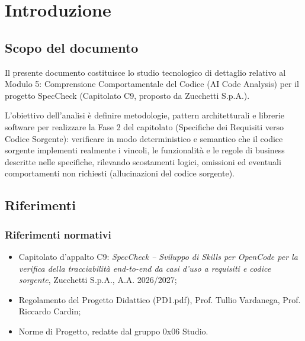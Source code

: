 \documentclass[a4paper, 11pt]{article}
\begin{document}
\newpage
\tableofcontents
\newpage

\section{Introduzione}

\subsection{Scopo del documento}
Il presente documento costituisce lo studio tecnologico di dettaglio relativo al Modulo 5: Comprensione Comportamentale del Codice (AI Code Analysis) per il progetto SpecCheck (Capitolato C9, proposto da Zucchetti S.p.A.).

L'obiettivo dell'analisi è definire metodologie, pattern architetturali e librerie software per realizzare la Fase 2 del capitolato (Specifiche dei Requisiti verso Codice Sorgente): verificare in modo deterministico e semantico che il codice sorgente implementi realmente i vincoli, le funzionalità e le regole di business descritte nelle specifiche, rilevando scostamenti logici, omissioni ed eventuali comportamenti non richiesti (allucinazioni del codice sorgente).

\subsection{Riferimenti}
\subsubsection{Riferimenti normativi}
\begin{itemize}[noitemsep]
    \item Capitolato d'appalto C9: \textit{SpecCheck -- Sviluppo di Skills per OpenCode per la verifica della tracciabilità end-to-end da casi d'uso a requisiti e codice sorgente}, Zucchetti S.p.A., A.A. 2026/2027;
    \item Regolamento del Progetto Didattico (PD1.pdf), Prof. Tullio Vardanega, Prof. Riccardo Cardin;
    \item Norme di Progetto, redatte dal gruppo 0x06 Studio.
\end{itemize}
\end{document}
